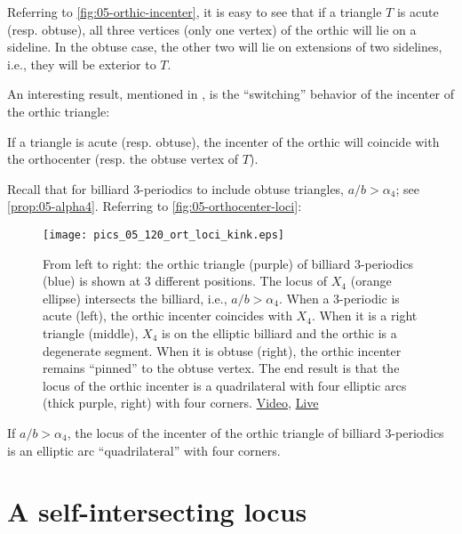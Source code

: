Referring to \cref{fig:05-orthic-incenter}, 
it is easy to see that if a triangle $T$ is acute (resp. obtuse), all three vertices (only one vertex) of the orthic will lie on a sideline. In the obtuse case, the other two will lie on extensions of two sidelines, i.e., they will be exterior to $T$.

An interesting result, mentioned in \cite[Chapter 1]{coxeter67}, is the ``switching'' behavior of the incenter of the orthic triangle:

\begin{lemma}
If a triangle is acute (resp. obtuse), the incenter of the orthic will coincide with the orthocenter (resp. the obtuse vertex of $T$).
\label{lem:05-pinned}
\end{lemma}

Recall that for billiard 3-periodics to include obtuse triangles, $a/b>\alpha_4$; see \cref{prop:05-alpha4}. Referring to
\cref{fig:05-orthocenter-loci}:

\begin{figure}
    \centering
    \texttt{[image: pics\_05\_120\_ort\_loci\_kink.eps]}
    \caption{From left to right: the orthic triangle (purple) of billiard 3-periodics (blue) is shown at 3 different positions. The locus of $X_4$ (orange ellipse) intersects the billiard, i.e., $a/b>\alpha_4$. When a 3-periodic is acute (left), the orthic incenter coincides with $X_4$. When it is a right triangle (middle), $X_4$ is on the elliptic billiard and the orthic is a degenerate segment. When it is obtuse (right), the orthic incenter remains ``pinned'' to the obtuse vertex. The end result is that the locus of the orthic incenter is a quadrilateral with four elliptic arcs (thick purple, right) with four corners.  \href{https://youtu.be/3qJnwpFkUFQ}{Video}, \href{https://bit.ly/33TVjit}{Live}}
    \label{fig:05-orthic_incenter_locus}
\end{figure}

\begin{corollary}
If $a/b>\alpha_4$, the locus of the incenter of the orthic triangle of billiard 3-periodics is an elliptic arc ``quadrilateral'' with four corners.
\end{corollary}


\section{A self-intersecting locus}

